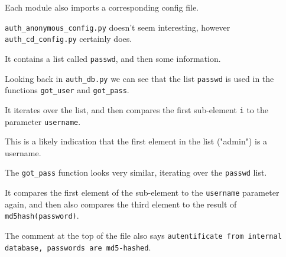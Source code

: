 {{{Each module also imports a corresponding config file. %







\lstinline`auth_anonymous_config.py` doesn't seem interesting, however \lstinline`auth_cd_config.py` certainly does. %







It contains a list called \lstinline`passwd`, and then some information. 















                    Looking back in \lstinline`auth_db.py` we can see that the list \lstinline`passwd` is used in the functions \lstinline`got_user` and \lstinline`got_pass`. %







It iterates over the list, and then compares the first sub-element \lstinline`i` to the parameter \lstinline`username`. %







This is a likely indication that the first element in the list ("admin") is a username. %







The \lstinline`got_pass` function looks very similar, iterating over the \lstinline`passwd` list. %







It compares the first element of the sub-element to the \lstinline`username` parameter again, and then also compares the third element to the result of \lstinline`md5hash(password)`. %







The comment at the top of the file also says \lstinline`autentificate from internal database, passwords are md5-hashed`. %







}}}
